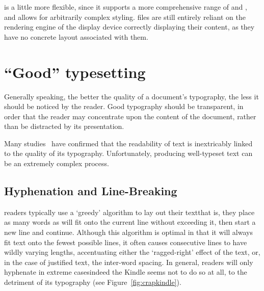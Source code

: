 
\epub{} is a little more flexible, since it supports a more comprehensive range of \xhtml{} and \css{}, and allows for arbitrarily complex styling. \epub{} files are still entirely reliant on the rendering engine of the display device correctly displaying their content, as they have no concrete layout associated with them.



\section{``Good'' typesetting}
\label{sec:goodtypesetting}

Generally speaking, the better the quality of a document's typography, the less it should be noticed by the reader. Good typography should be transparent, in order that the reader may concentrate upon the content of the document, rather than be distracted by its presentation.

Many studies~\cite{Mittelbach1992,Hill1999,Bringhurst2008,Voorhees2011,Legge2011} have confirmed that the readability of text is inextricably linked to the quality of its typography. Unfortunately, producing well-typeset text can be an extremely complex process.



\subsection{Hyphenation and Line-Breaking}
\Ebook{} readers typically use a `greedy' algorithm to lay out their text\ed that is, they place as many words as will fit onto the current line without exceeding it, then start a new line and continue. Although this algorithm is optimal in that it will always fit text onto the fewest possible lines, it often causes consecutive lines to have wildly varying lengths, accentuating either the `ragged-right' effect of the text, or, in the case of justified text, the inter-word spacing. In general, \ebook{} readers will only hyphenate in extreme cases\ed indeed the Kindle seems not to do so at all, to the detriment of its typography (see Figure~\ref{fig:crapkindle}).


